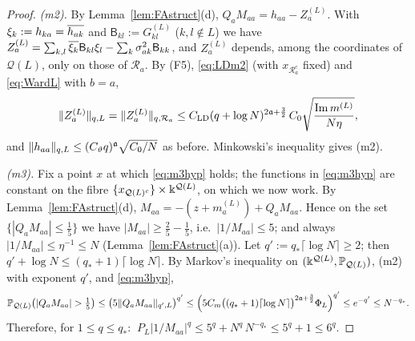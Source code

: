 \begin{proof}
\emph{(m2).} By Lemma~\ref{lem:FAstruct}(d), $Q_aM_{aa}=h_{aa}-Z_a^{(L)}$. With $\xi_k:=h_{ka}=\overline{h_{ak}}$ and $\mathsf B_{kl}:=G^{(L)}_{kl}$ ($k,l\notin L$) we have $Z_a^{(L)}=\sum_{k,l}\overline{\xi_k}\mathsf B_{kl}\xi_l-\sum_k\sigma_{ak}^2\mathsf B_{kk}$, and $Z_a^{(L)}$ depends, among the coordinates of $\mathcal Q(L)$, only on those of $\mathcal R_a$.
By (F5), \eqref{eq:LDm2} (with $x_{\mathcal R_a^c}$ fixed) and \eqref{eq:WardL} with $b=a$,
\[
 \|Z_a^{(L)}\|_{q,L}=\|Z_a^{(L)}\|_{q,\mathcal R_a}\le C_{\rm LD}(q+\log N)^{2\mathfrak{a}+\frac32}\,C_0\sqrt{\frac{\operatorname{Im} m^{(L)}}{N\eta}},
\]
and $\|h_{aa}\|_{q,L}\le(C_\vartheta q)^{\mathfrak{a}}\sqrt{C_0/N}$ as before. Minkowski's inequality gives (m2).

\emph{(m3).} Fix a point $x$ at which \eqref{eq:m3hyp} holds; the functions in \eqref{eq:m3hyp} are constant on the fibre $\{x_{\mathcal Q(L)^c}\}\times\Bbbk^{\mathcal Q(L)}$, on which we now work. By Lemma~\ref{lem:FAstruct}(d), $M_{aa}=-(z+m_a^{(L)})+Q_aM_{aa}$.
Hence on the set $\{|Q_aM_{aa}|\le\frac15\}$ we have $|M_{aa}|\ge\frac25-\frac15$, i.e.\ $|1/M_{aa}|\le5$; and always $|1/M_{aa}|\le\eta^{-1}\le N$ (Lemma~\ref{lem:FAstruct}(a)).
Let $q':=q_*\lceil\log N\rceil\ge2$; then $q'+\log N\le(q_*+1)\lceil\log N\rceil$. By Markov's inequality on $(\Bbbk^{\mathcal Q(L)},\mathbb{P}_{\mathcal Q(L)})$, (m2) with exponent $q'$, and \eqref{eq:m3hyp},
\[
 \PP_{\mathcal Q(L)}\big(|Q_aM_{aa}|>\tfrac15\big)\le\big(5\norm{Q_aM_{aa}}_{q',L}\big)^{q'}\le\Big(5C_m\big((q_*+1)\lceil\log N\rceil\big)^{2\fa+\frac32}\Phi_L\Big)^{q'}\le e^{-q'}\le N^{-q_*}.
\]
Therefore, for $1\le q\le q_*$: $\ P_L|1/M_{aa}|^q\le5^q+N^q\,N^{-q_*}\le5^q+1\le6^q$.
\end{proof}

